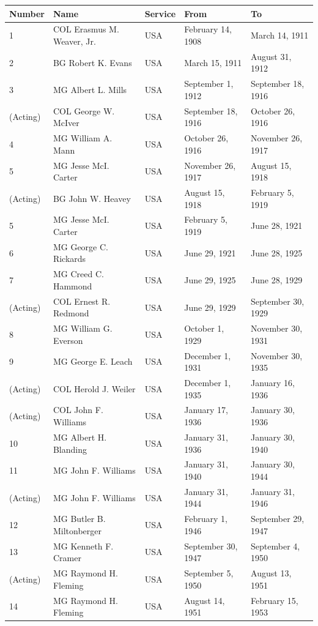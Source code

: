 \documentclass{article}
\begin{document}
\begin{tabular}{lllll}
\toprule
Number & Name & Service & From & To \\
\midrule
1 & COL Erasmus M. Weaver, Jr. & USA & February 14, 1908 & March 14, 1911 \\
2 & BG Robert K. Evans & USA & March 15, 1911 & August 31, 1912 \\
3 & MG Albert L. Mills & USA & September 1, 1912 & September 18, 1916 \\
(Acting) & COL George W. McIver & USA & September 18, 1916 & October 26, 1916 \\
4 & MG William A. Mann & USA & October 26, 1916 & November 26, 1917 \\
5 & MG Jesse McI. Carter & USA & November 26, 1917 & August 15, 1918 \\
(Acting) & BG John W. Heavey & USA & August 15, 1918 & February 5, 1919 \\
5 & MG Jesse McI. Carter & USA & February 5, 1919 & June 28, 1921 \\
6 & MG George C. Rickards & USA & June 29, 1921 & June 28, 1925 \\
7 & MG Creed C. Hammond & USA & June 29, 1925 & June 28, 1929 \\
(Acting) & COL Ernest R. Redmond & USA & June 29, 1929 & September 30, 1929 \\
8 & MG William G. Everson & USA & October 1, 1929 & November 30, 1931 \\
9 & MG George E. Leach & USA & December 1, 1931 & November 30, 1935 \\
(Acting) & COL Herold J. Weiler & USA & December 1, 1935 & January 16, 1936 \\
(Acting) & COL John F. Williams & USA & January 17, 1936 & January 30, 1936 \\
10 & MG Albert H. Blanding & USA & January 31, 1936 & January 30, 1940 \\
11 & MG John F. Williams & USA & January 31, 1940 & January 30, 1944 \\
(Acting) & MG John F. Williams & USA & January 31, 1944 & January 31, 1946 \\
12 & MG Butler B. Miltonberger & USA & February 1, 1946 & September 29, 1947 \\
13 & MG Kenneth F. Cramer & USA & September 30, 1947 & September 4, 1950 \\
(Acting) & MG Raymond H. Fleming & USA & September 5, 1950 & August 13, 1951 \\
14 & MG Raymond H. Fleming & USA & August 14, 1951 & February 15, 1953 \\

\end{tabular}
\end{document}
